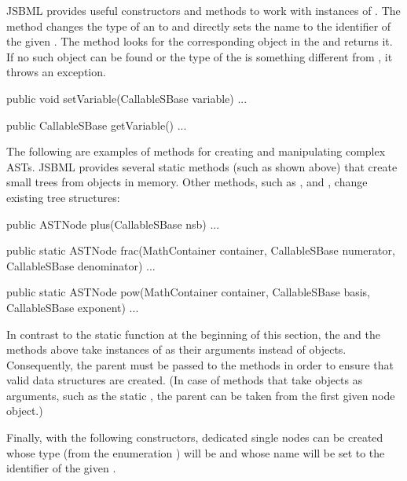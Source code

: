 JSBML provides useful constructors and methods to work with instances of
\CallableSBase.  The  method changes the type of an \ASTNode to
\ASTTypeName and directly sets the name to the identifier of the given
\CallableSBase.  The  method looks for the corresponding object in
the \Model and returns it. If no such object can be found or the type of the
\ASTNode is something different from \ASTTypeName, it throws an exception.

\begin{example}[title={Getter and setter for \CallableSBase.}]
public void setVariable(CallableSBase variable) { ... }

public CallableSBase getVariable() { ... }
\end{example}

The following are examples of methods for creating and manipulating complex
ASTs.  JSBML provides several static methods (such as  shown above)
that create small trees from objects in memory.  Other methods, such as
,  and , change existing tree structures:

\begin{example}[title={Some examples for convenience methods, some of
    them static methods, provided by JSBML for working with \ASTNode{}s.}]
public ASTNode plus(CallableSBase nsb) { ... }

public static ASTNode frac(MathContainer container,
      CallableSBase numerator, CallableSBase denominator) { ... }

public static ASTNode pow(MathContainer container,
      CallableSBase basis, CallableSBase exponent) { ... }
\end{example}

In contrast to the static  function at the beginning of
this section, the  and the  methods above take instances
of \CallableSBase as their arguments instead of \ASTNode objects. Consequently, the
parent \MathContainer must be passed to the methods in order to ensure that
valid data structures are created. (In case of methods that take \ASTNode
objects as arguments, such as the static , the parent
\MathContainer can be taken from the first given node object.)

Finally, with the following \ASTNode constructors, dedicated single nodes can
be created whose type (from the enumeration \ASTType) will be  and
whose name will be set to the identifier of the given \CallableSBase.

